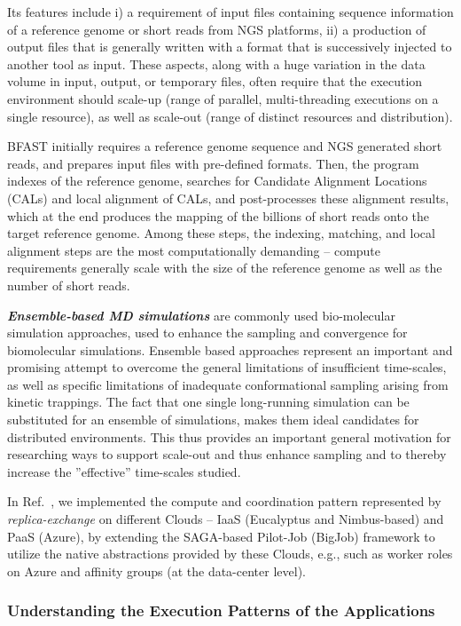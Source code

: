 \documentclass[10pt,conference,final,letterpaper,twoside,twocolumn,]{IEEEtran}
\newcommand{\I}[1]{\textit{#1}}
\newcommand{\B}[1]{\textbf{#1}}
\newcommand{\BI}[1]{\B{\I{#1}}}
\begin{document}
 Its features include i) a requirement of input files containing
 sequence information of a reference genome or short reads from NGS
 platforms, ii) a production of output files that is generally written
 with a format that is successively injected to another tool as input.
 These aspects, along with a huge variation in the data volume in
 input, output, or temporary files, often require that the execution
 environment should scale-up (range of parallel, multi-threading
 executions on a single resource), as well as scale-out (range of
 distinct resources and distribution).
 
 BFAST initially requires a reference genome sequence and NGS
 generated short reads, and prepares input files with pre-defined
 formats.  Then, the program indexes of the reference genome, searches
 for Candidate Alignment Locations (CALs) and local alignment of CALs,
 and post-processes these alignment results, which at the end produces
 the mapping of the billions of short reads onto the target reference
 genome.  Among these steps, the indexing, matching, and local
 alignment steps are the most computationally demanding -- compute
 requirements generally scale with the size of the reference genome as
 well as the number of short reads.

 \BI{Ensemble-based MD simulations} are commonly used bio-molecular
 simulation approaches, used to enhance the sampling and convergence
 for biomolecular simulations.  Ensemble based approaches represent an
 important and promising attempt to overcome the general limitations
 of insufficient time-scales, as well as specific limitations of
 inadequate conformational sampling arising from kinetic trappings.
 The fact that one single long-running simulation can be substituted
 for an ensemble of simulations, makes them ideal candidates for
 distributed environments.  This thus provides an important general
 motivation for researching ways to support scale-out and thus enhance
 sampling and to thereby increase the ''effective'' time-scales
 studied. 
 
 In Ref.~\cite{ccgrid10, cloudcom10}, we implemented the compute
 and coordination pattern represented by \I{replica-exchange} on
 different Clouds -- IaaS (Eucalyptus and Nimbus-based) and PaaS
 (Azure), by extending the SAGA-based Pilot-Job (BigJob) framework to
 utilize the native abstractions provided by these Clouds, e.g., such
 as worker roles on Azure and affinity groups (at the data-center
 level).


 \subsubsection*{Understanding the Execution Patterns of the
   Applications}
\end{document}

